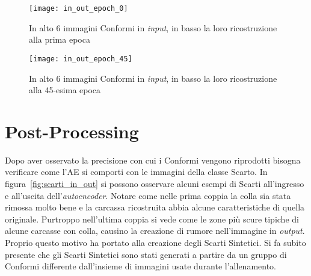 \begin{figure}[ht] %
  \begin{center}
    \texttt{[image: in\_out\_epoch\_0]}
    \caption{In alto 6 immagini Conformi in \textit{input}, in basso la loro ricostruzione alla prima epoca}
    \label{fig:epoch_0}
  \end{center}
\end{figure}

\begin{figure}[ht] %
  \begin{center}
    \texttt{[image: in\_out\_epoch\_45]}
    \caption{In alto 6 immagini Conformi in \textit{input}, in basso la loro ricostruzione alla 45-esima epoca}
    \label{fig:epoch_45}
  \end{center}
\end{figure}

\clearpage
\section{Post-Processing}
Dopo aver osservato la precisione con cui i Conformi vengono riprodotti bisogna verificare come l'AE si comporti con le immagini della classe Scarto.
In figura~\ref{fig:scarti_in_out} si possono osservare alcuni esempi di Scarti all'ingresso e all'uscita dell'\textit{autoencoder}.
Notare come nelle prima coppia la colla sia stata rimossa molto bene e la carcassa ricostruita abbia alcune caratteristiche di quella originale.
Purtroppo nell'ultima coppia si vede come le zone più scure tipiche di alcune carcasse con colla, causino la creazione di rumore nell'immagine in \textit{output}.
Proprio questo motivo ha portato alla creazione degli Scarti Sintetici.
Si fa subito presente che gli Scarti Sintetici sono stati generati a partire da un gruppo di Conformi differente dall'insieme di immagini usate durante l'allenamento.

